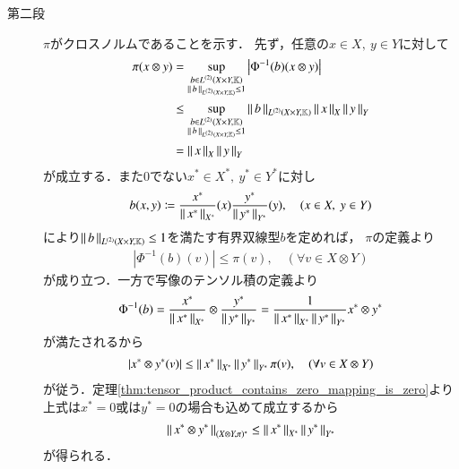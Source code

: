 \begin{prf}
\begin{description}
			\item[第二段]
				$\pi$がクロスノルムであることを示す．
				先ず，任意の$x \in X,\ y \in Y$に対して
				\begin{align}
					\pi(x \otimes y) 
					&= \sup{\substack{b \in \ContLn{X \times Y}{\K}{2} \\ \Norm{b}{\ContLn{X \times Y}{\K}{2}} \leq 1}}{\left| \Phi^{-1}(b)(x \otimes y) \right|} \\
					& \leq \sup{\substack{b \in \ContLn{X \times Y}{\K}{2} \\ \Norm{b}{\ContLn{X \times Y}{\K}{2}} \leq 1}}{\Norm{b}{\ContLn{X \times Y}{\K}{2}}\Norm{x}{X} \Norm{y}{Y}} \\
					&= \Norm{x}{X} \Norm{y}{Y}
				\end{align}
				が成立する．また0でない$x^* \in X^*,\ y^* \in Y^*$に対し
				\begin{align}
					b(x,y) \coloneqq \frac{x^*}{\Norm{x^*}{X^*}}(x)\frac{y^*}{\Norm{y^*}{Y^*}}(y),
					\quad (x \in X,\ y \in Y)
				\end{align}
				により$\Norm{b}{\ContLn{X \times Y}{\K}{2}} \leq 1$を満たす有界双線型$b$を定めれば，
				$\pi$の定義より
				\begin{align}
					\left| \Phi^{-1}(b)(v) \right| \leq \pi(v),
					\quad (\forall v \in X \otimes Y)
				\end{align}
				が成り立つ．一方で写像のテンソル積の定義より
				\begin{align}
					\Phi^{-1}(b) = \frac{x^*}{\Norm{x^*}{X^*}} \otimes \frac{y^*}{\Norm{y^*}{Y^*}}
					= \frac{1}{\Norm{x^*}{X^*}\Norm{y^*}{Y^*}} x^* \otimes y^*
				\end{align}
				が満たされるから
				\begin{align}
					\left| x^* \otimes y^*(v) \right| \leq \Norm{x^*}{X^*}\Norm{y^*}{Y^*} \pi(v),
					\quad (\forall v \in X \otimes Y)
				\end{align}
				が従う．定理\ref{thm:tensor_product_contains_zero_mapping_is_zero}より
				上式は$x^* = 0$或は$y^* = 0$の場合も込めて成立するから
				\begin{align}
					\Norm{x^* \otimes y^*}{(X \otimes Y,\pi)^*} \leq \Norm{x^*}{X^*}\Norm{y^*}{Y^*}
				\end{align}
				が得られる．
				

\end{description}
\end{prf}
